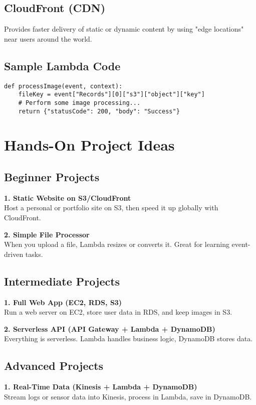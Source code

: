 \documentclass[12pt]{article}
\begin{document}
\subsection{CloudFront (CDN)}
Provides faster delivery of static or dynamic content by using "edge locations" near users around the world.

\subsection{Sample Lambda Code}
\begin{verbatim}
def processImage(event, context):
    fileKey = event["Records"][0]["s3"]["object"]["key"]
    # Perform some image processing...
    return {"statusCode": 200, "body": "Success"}
\end{verbatim}

\clearpage

\section{Hands-On Project Ideas}
\justifying

\subsection{Beginner Projects}
\textbf{1. Static Website on S3/CloudFront}\\
Host a personal or portfolio site on S3, then speed it up globally with CloudFront.

\textbf{2. Simple File Processor}\\
When you upload a file, Lambda resizes or converts it. Great for learning event-driven tasks.

\subsection{Intermediate Projects}
\textbf{1. Full Web App (EC2, RDS, S3)}\\
Run a web server on EC2, store user data in RDS, and keep images in S3.

\textbf{2. Serverless API (API Gateway + Lambda + DynamoDB)}\\
Everything is serverless. Lambda handles business logic, DynamoDB stores data.

\subsection{Advanced Projects}
\textbf{1. Real-Time Data (Kinesis + Lambda + DynamoDB)}\\
Stream logs or sensor data into Kinesis, process in Lambda, save in DynamoDB.
\end{document}
